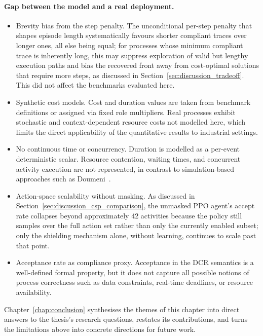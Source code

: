 \paragraph{Gap between the model and a real deployment.}
\begin{itemize}

    \item Brevity bias from the step penalty.
    The unconditional per-step penalty that shapes episode length
    systematically favours shorter compliant traces over longer ones,
    all else being equal; for processes whose minimum compliant trace
    is inherently long, this may suppress exploration of valid but
    lengthy execution paths and bias the recovered front away from
    cost-optimal solutions that require more steps, as discussed in
    Section~\ref{sec:discussion_tradeoff}. This did not affect the
    benchmarks evaluated here.

    \item Synthetic cost models.
    Cost and duration values are taken from benchmark
    definitions or assigned via fixed role multipliers.
    Real processes exhibit stochastic and context-dependent
    resource costs not modelled here, which limits the
    direct applicability of the quantitative results to
    industrial settings.

    \item No continuous time or concurrency.
    Duration is modelled as a per-event deterministic scalar.
    Resource contention, waiting times, and concurrent
    activity execution are not represented, in contrast to
    simulation-based approaches such as
    Doumeni~\cite{ArtemisDoumeniParetoAgentSimulator}.

    \item Action-space scalability without masking.
    As discussed in Section~\ref{sec:discussion_csp_comparison}, the
    unmasked \ac{PPO} agent's accept rate collapses beyond
    approximately 42 activities because the policy still
    samples over the full action set rather than only the currently
    enabled subset; only the shielding mechanism alone, without
    learning, continues to scale past that point.

    \item Acceptance rate as compliance proxy.
    Acceptance in the \ac{DCR} semantics is a well-defined
    formal property, but it does not capture all possible
    notions of process correctness such as data constraints,
    real-time deadlines, or resource availability.

\end{itemize}

Chapter~\ref{chap:conclusion} synthesises the themes of this chapter into direct answers to the thesis's research questions, restates its contributions, and turns the limitations above into concrete directions for future work.
